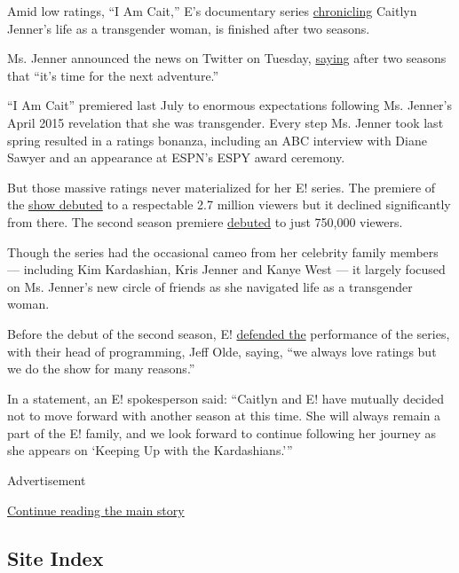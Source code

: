 Amid low ratings, ``I Am Cait,'' E's documentary series
\href{http://www.nytimes3xbfgragh.onion/2015/07/23/arts/television/with-caitlyn-jenners-new-show-a-reality-producer-tries-to-tame-the-antics.html}{chronicling}
Caitlyn Jenner's life as a transgender woman, is finished after two
seasons.

Ms. Jenner announced the news on Twitter on Tuesday,
\href{https://twitter.com/Caitlyn_Jenner/status/765626711752908800}{saying}
after two seasons that ``it's time for the next adventure.''

``I Am Cait'' premiered last July to enormous expectations following Ms.
Jenner's April 2015 revelation that she was transgender. Every step Ms.
Jenner took last spring resulted in a ratings bonanza, including an ABC
interview with Diane Sawyer and an appearance at ESPN's ESPY award
ceremony.

But those massive ratings never materialized for her E! series. The
premiere of the
\href{http://www.nytimes3xbfgragh.onion/2015/07/29/arts/television/i-am-cait-scores-solid-ratings-for-e.html}{show
debuted} to a respectable 2.7 million viewers but it declined
significantly from there. The second season premiere
\href{http://www.hollywoodreporter.com/live-feed/tv-ratings-caitlyn-jenners-reality-873419}{debuted}
to just 750,000 viewers.

Though the series had the occasional cameo from her celebrity family
members --- including Kim Kardashian, Kris Jenner and Kanye West --- it
largely focused on Ms. Jenner's new circle of friends as she navigated
life as a transgender woman.

Before the debut of the second season, E!
\href{http://www.nytimes3xbfgragh.onion/2016/01/15/business/media/i-am-cait-now-in-season-2-takes-caitlyn-jenner-on-a-tv-road-less-traveled.html}{defended
the} performance of the series, with their head of programming, Jeff
Olde, saying, ``we always love ratings but we do the show for many
reasons.''

In a statement, an E! spokesperson said: ``Caitlyn and E! have mutually
decided not to move forward with another season at this time. She will
always remain a part of the E! family, and we look forward to continue
following her journey as she appears on `Keeping Up with the
Kardashians.'''

Advertisement

\protect\hyperlink{after-bottom}{Continue reading the main story}

\hypertarget{site-index}{%
\subsection{Site Index}\label{site-index}}

